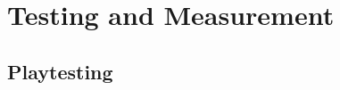 \chapter[Testing and Measurement]{Testing and Measurement}
\label{ch:measurement}

\section{Playtesting}
